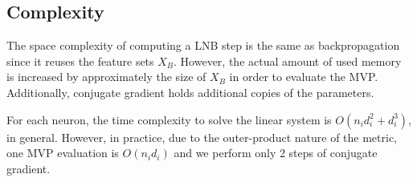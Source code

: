 \subsection{Complexity}
The space complexity of computing a LNB step is the same as backpropagation since
it reuses the feature sets $X_B$. However, the actual amount of used memory is increased by
approximately the size of $X_B$ in order to evaluate the MVP. Additionally, conjugate
gradient holds additional copies of the parameters.

For each neuron, the time complexity to solve the linear system is $O(n_id_i^2 + d_i^3)$, in general.
However, in practice, due to the outer-product nature of the metric, one MVP evaluation is
$O(n_i d_i)$ and we perform only 2 steps of conjugate gradient.
